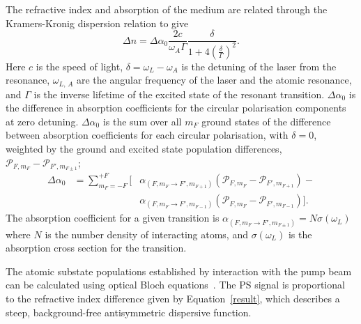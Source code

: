 The refractive index and absorption of the medium are related through the Kramers-Kronig dispersion relation to give~\cite{demtroder_laser_2003}
\begin{equation}
\Delta n = \Delta\alpha_0 \frac{2c}{\omega_A \Gamma}\frac{\delta}{1+4\left(\frac{\delta}{\Gamma}\right)^2}.\label{result}
\end{equation}
Here $c$ is the speed of light, $\delta=\omega_L-\omega_A$ is the detuning of the laser from the resonance, $\omega_{L,\,A}$ are the angular frequency of the laser and the atomic resonance, and $\Gamma$ is the inverse lifetime of the excited state of the resonant transition.
$\Delta\alpha_0$ is the difference in absorption coefficients for the circular polarisation components at zero detuning.
$\Delta\alpha_0$ is the sum over all $m_F$ ground states of the difference between absorption coefficients for each circular polarisation, with $\delta=0$, weighted by the ground and excited state population differences, $\mathcal{P}_{F,m_F}-\mathcal{P}_{F',m_{F\pm1}}$;
\begin{eqnarray}
\Delta\alpha_0 &= \sum_{m_F=-F}^{+F} \Big[&\alpha_{(F,m_F\rightarrow F',m_{F+1})}(\mathcal{P}_{F,m_F}-\mathcal{P}_{F',m_{F+1}})-\nonumber\\
&&\alpha_{(F,m_F\rightarrow F',m_{F-1})}(\mathcal{P}_{F,m_F}-\mathcal{P}_{F',m_{F-1}})\Big].
\end{eqnarray}
The absorption coefficient for a given transition is $\alpha_{(F, m_F\rightarrow F',m_{F\pm1})}=N \sigma(\omega_L)$ where $N$ is the number density of interacting atoms, and $\sigma(\omega_L)$ is the absorption cross section for the transition.

The atomic substate populations established by interaction with the pump beam can be calculated using optical Bloch equations~\cite{hughes_polarization_2009}.
The PS signal is proportional to the refractive index difference given by Equation~\ref{result}, which describes a steep, background-free antisymmetric dispersive function.

